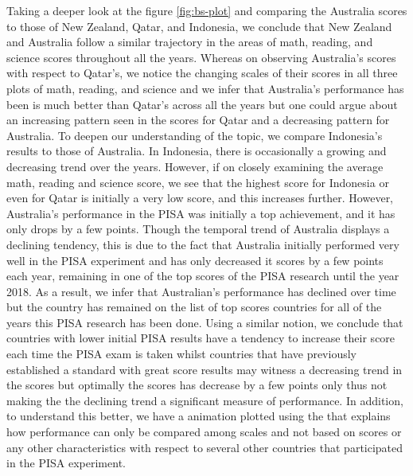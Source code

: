Taking a deeper look at the figure \ref{fig:bs-plot} and comparing the
Australia scores to those of New Zealand, Qatar, and Indonesia, we
conclude that New Zealand and Australia follow a similar trajectory in
the areas of math, reading, and science scores throughout all the years.
Whereas on observing Australia's scores with respect to Qatar's, we
notice the changing scales of their scores in all three plots of math,
reading, and science and we infer that Australia's performance has been
is much better than Qatar's across all the years but one could argue
about an increasing pattern seen in the scores for Qatar and a
decreasing pattern for Australia. To deepen our understanding of the
topic, we compare Indonesia's results to those of Australia. In
Indonesia, there is occasionally a growing and decreasing trend over the
years. However, if on closely examining the average math, reading and
science score, we see that the highest score for Indonesia or even for
Qatar is initially a very low score, and this increases further.
However, Australia's performance in the PISA was initially a top
achievement, and it has only drops by a few points. Though the temporal
trend of Australia displays a declining tendency, this is due to the
fact that Australia initially performed very well in the PISA experiment
and has only decreased it scores by a few points each year, remaining in
one of the top scores of the PISA research until the year 2018. As a
result, we infer that Australian's performance has declined over time
but the country has remained on the list of top scores countries for all
of the years this PISA research has been done. Using a similar notion,
we conclude that countries with lower initial PISA results have a
tendency to increase their score each time the PISA exam is taken whilst
countries that have previously established a standard with great score
results may witness a decreasing trend in the scores but optimally the
scores has decrease by a few points only thus not making the the
declining trend a significant measure of performance. In addition, to
understand this better, we have a animation plotted using
 \citep{gganimate} the that explains how performance
can only be compared among scales and not based on scores or any other
characteristics with respect to several other countries that
participated in the PISA experiment.



\address{%
Priya Ravindra Dingorkar\\
Monash University\\%
Department Econometrics and Business Statistics\\ Clayton, Australia\\
%
\url{https://www.linkedin.com/in/priya-dingorkar/}\\%
%
\href{mailto:priyadingorkar@gmail.com}{\nolinkurl{priyadingorkar@gmail.com}}%
}

